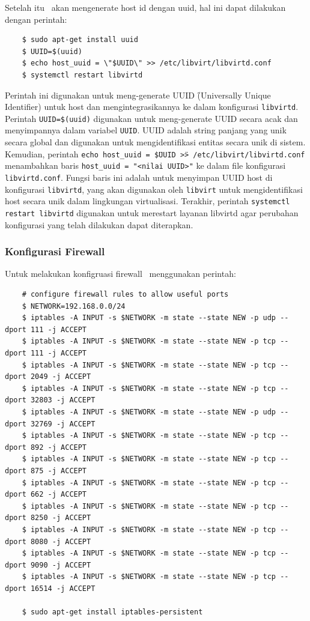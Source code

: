 Setelah itu \saya\ akan mengenerate host id dengan uuid, hal ini dapat dilakukan dengan perintah:

\begin{listing}[H]
    \begin{verbatim}   
    $ sudo apt-get install uuid
    $ UUID=$(uuid)
    $ echo host_uuid = \"$UUID\" >> /etc/libvirt/libvirtd.conf
    $ systemctl restart libvirtd
    \end{verbatim}
\end{listing}

Perintah ini digunakan untuk meng-generate UUID \f{(Universally Unique Identifier)} untuk host dan mengintegrasikannya ke dalam konfigurasi \texttt{libvirtd}. Perintah \texttt{UUID=\$(uuid)} digunakan untuk meng-generate UUID secara acak dan menyimpannya dalam variabel \texttt{UUID}. UUID adalah string panjang yang unik secara global dan digunakan untuk mengidentifikasi entitas secara unik di sistem. Kemudian, perintah \texttt{echo host\_uuid = \" \$UUID \"  >> /etc/libvirt/libvirtd.conf} menambahkan baris \texttt{host\_uuid = "<nilai UUID>"} ke dalam file konfigurasi \texttt{libvirtd.conf}. Fungsi baris ini adalah untuk menyimpan UUID host di konfigurasi \texttt{libvirtd}, yang akan digunakan oleh \texttt{libvirt} untuk mengidentifikasi host secara unik dalam lingkungan virtualisasi. Terakhir, perintah \texttt{systemctl restart libvirtd} digunakan untuk merestart layanan libvirtd agar perubahan konfigurasi yang telah dilakukan dapat diterapkan.

\subsubsection{Konfigurasi Firewall}
Untuk melakukan konfigruasi firewall \saya\ menggunakan perintah:

\begin{listing}[H]
    \begin{verbatim}       
    # configure firewall rules to allow useful ports
    $ NETWORK=192.168.0.0/24
    $ iptables -A INPUT -s $NETWORK -m state --state NEW -p udp --dport 111 -j ACCEPT
    $ iptables -A INPUT -s $NETWORK -m state --state NEW -p tcp --dport 111 -j ACCEPT
    $ iptables -A INPUT -s $NETWORK -m state --state NEW -p tcp --dport 2049 -j ACCEPT
    $ iptables -A INPUT -s $NETWORK -m state --state NEW -p tcp --dport 32803 -j ACCEPT
    $ iptables -A INPUT -s $NETWORK -m state --state NEW -p udp --dport 32769 -j ACCEPT
    $ iptables -A INPUT -s $NETWORK -m state --state NEW -p tcp --dport 892 -j ACCEPT
    $ iptables -A INPUT -s $NETWORK -m state --state NEW -p tcp --dport 875 -j ACCEPT
    $ iptables -A INPUT -s $NETWORK -m state --state NEW -p tcp --dport 662 -j ACCEPT
    $ iptables -A INPUT -s $NETWORK -m state --state NEW -p tcp --dport 8250 -j ACCEPT
    $ iptables -A INPUT -s $NETWORK -m state --state NEW -p tcp --dport 8080 -j ACCEPT
    $ iptables -A INPUT -s $NETWORK -m state --state NEW -p tcp --dport 9090 -j ACCEPT
    $ iptables -A INPUT -s $NETWORK -m state --state NEW -p tcp --dport 16514 -j ACCEPT
    
    $ sudo apt-get install iptables-persistent
    \end{verbatim}
\end{listing}

